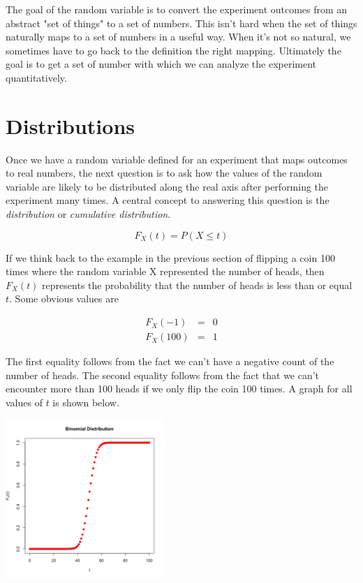\documentclass[]{article}
\begin{document}
The goal of the random variable is to convert the experiment
outcomes from an abstract "set of things" to a set of numbers.
This isn't hard when the set of things naturally maps to a set
of numbers in a useful way.  When it's not so natural, we
sometimes have to go back to the definition the right mapping.
Ultimately the goal is to get a set of number with which we
can analyze the experiment quantitatively.

\section{Distributions}

Once we have a random variable defined for an experiment that
maps outcomes to real numbers, the next question is to ask
how the values of the random variable are likely to be
distributed along the real axis after performing the
experiment many times.  A central concept to answering
this question is the \emph{distribution} or 
\emph{cumulative distribution}.

$$
F_X(t) = P(X \le t)
$$

If we think back to the example in the previous section
of flipping a coin 100 times where the random variable X
represented the number of heads, then $F_X(t)$ represents
the probability that the number of heads is less than or
equal $t$.  Some obvious values are

\begin{eqnarray*}
F_X(-1) & = & 0\\
F_X(100) & = & 1
\end{eqnarray*}

The first equality follows from the fact we can't have a
negative count of the number of heads.  The second
equality follows from the fact that we can't encounter
more than 100 heads if we only flip the coin 100 times.
A graph for all values of $t$ is shown below.

  \includegraphics[height=6cm,keepaspectratio]{cdf1.png}
\end{document}
